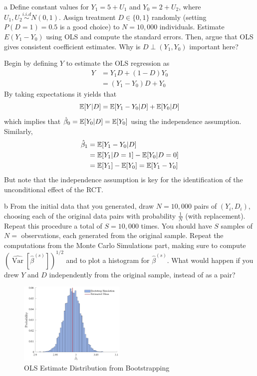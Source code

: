 \documentclass{article}
\begin{document}
\begin{problem}{a}
Define constant values for $Y_{1}=5+U_{1}$ and $Y_{0}=2+U_{2}$, where $U_{1}, U_{2} \stackrel{i . i . d}{\sim} N(0,1)$. Assign treatment $D \in\{0,1\}$ randomly (setting $P(D=1)=0.5$ is a good choice) to $N=10,000$ individuals. Estimate $E\left(Y_{1}-Y_{0}\right)$ using OLS and compute the standard errors. Then, argue that OLS gives consistent coefficient estimates. Why is $D \perp\left(Y_{1}, Y_{0}\right)$ important here?
\end{problem}
\begin{solution}
Begin by defining $Y$ to estimate the OLS regression as 
\begin{align*}
    Y   &= Y_1D + (1-D)Y_0 \\ 
        &= (Y_1-Y_0)D + Y_0
\end{align*}
By taking expectations it yields that 
\begin{equation*}
    \mathbb{E}[Y\vert D] = \mathbb{E}[Y_1-Y_0\vert D] + \mathbb{E}[Y_0\vert D]
\end{equation*}
which implies that $\hat{\beta}_0=\mathbb{E}[Y_0\vert D] = \mathbb{E}[Y_0]$ using the independence assumption. Similarly, 
\begin{align*}
\hat{\beta}_1 & =\mathbb{E}[Y_1-Y_0\vert D] \\
&= \mathbb{E}[Y_1\vert D=1] - \mathbb{E}[Y_0\vert D=0] \\ 
&= \mathbb{E}[Y_1]-\mathbb{E}[Y_0] = \mathbb{E}[Y_1-Y_0] 
\end{align*}
But note that the independence assumption is key for the identification of the unconditional effect of the RCT. 

\end{solution}
\begin{problem}{b}
From the initial data that you generated, draw $N=10,000$ pairs of $\left(Y_{i}, D_{i}\right)$, choosing each of the original data pairs with probability $\frac{1}{N}$ (with replacement). Repeat this procedure a total of $S=10,000$ times. You should have $S$ samples of $N=$ observations, each generated from the original sample. Repeat the computations from the Monte Carlo Simulations part, making sure to compute $\left(\widehat{\operatorname{Var}}\left[\hat{\beta}^{(s)}\right]\right)^{1 / 2}$ and to plot a histogram for $\hat{\beta}^{(s)}$. What would happen if you drew $Y$ and $D$ independently from the original sample, instead of as a pair?
\end{problem}
\begin{solution}

\begin{figure}[htb]
    \centering
    \caption{OLS Estimate Distribution from Bootstrapping}
    \label{ea3:ps1:q3a:fig1}
    \includegraphics[width=0.45\textwidth]{Figures/p3qb.pdf}
\end{figure}
\end{solution}
\end{document}
